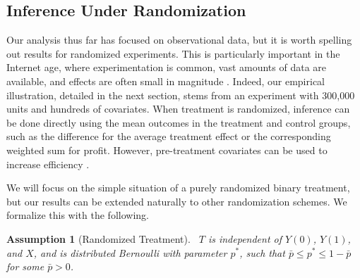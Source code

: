 \documentclass[11pt]{article}
\newtheorem{assumption}{Assumption}
\numberwithin{equation}{section}
\theoremstyle{definition}
\begin{document}
	





\subsection{Inference Under Randomization}
	\label{sec:rct}
	
	
Our analysis thus far has focused on observational data, but it is worth spelling out results for randomized experiments. This is particularly important in the Internet age, where experimentation is common, vast amounts of data are available, and effects are often small in magnitude \citep{Taddy-etal2015_WP}. Indeed, our empirical illustration, detailed in the next section, stems from an experiment with 300,000 units and hundreds of covariates.  When treatment is randomized, inference can be done directly using the mean outcomes in the treatment and control groups, such as the difference for the average treatment effect or the corresponding weighted sum for profit. However, pre-treatment covariates can be used to increase efficiency \citep{Hahn2004_REStat}.


We will focus on the simple situation of a purely randomized binary treatment, but our results can be extended naturally to other randomization schemes. We formalize this with the following.

\begin{assumption}[Randomized Treatment]
	\label{asmpt:rct} \
	$T$ is independent of $Y(0)$, $Y(1)$, and $X$, and is distributed Bernoulli with parameter $p^*$, such that $\bar{p} \leq p^* \leq 1 - \bar{p}$ for some $\bar{p} > 0$.
\end{assumption}
\end{document}

